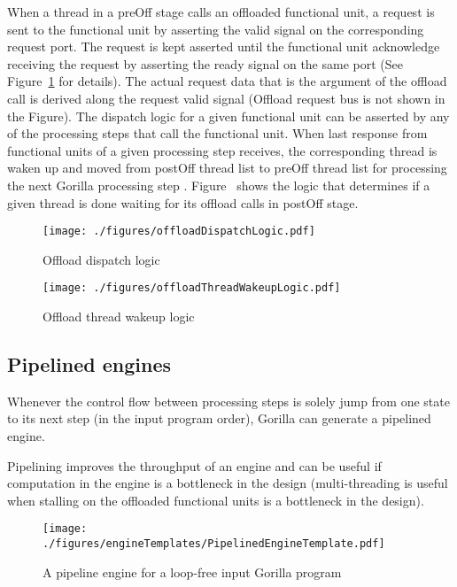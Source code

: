 \documentclass[a4paper, 12pt]{report}
\begin{document}
When a thread in a preOff stage calls an offloaded functional 
unit, a request is sent to the functional unit by asserting 
the valid signal on the corresponding request port. 
The request is kept asserted until the functional unit acknowledge 
receiving the request by asserting the ready signal on the same 
port (See Figure~\ref{fig:offloadDispatchLogic} for 
details). The actual request data that is the argument of 
the offload call is derived along the request valid signal 
(Offload request bus is not shown in the Figure).
The dispatch logic for a given functional unit can be 
asserted by any of the processing steps that call the 
functional unit.  
When last response from functional units of a given 
processing step receives, the corresponding thread is 
waken up and moved from postOff thread list to preOff 
thread list for processing the next Gorilla processing 
step . Figure~\label{fig:offloadThreadWakeupLogic} shows 
the logic that determines if a given thread is done waiting 
for its offload calls in postOff stage. 
 
\begin{figure}
\begin{center}
  \texttt{[image: ./figures/offloadDispatchLogic.pdf]}
  \caption{Offload dispatch logic}
  \label{fig:offloadDispatchLogic}
\end{center}
\end{figure}

\begin{figure}
\begin{center}
  \texttt{[image: ./figures/offloadThreadWakeupLogic.pdf]}
  \caption{Offload thread wakeup logic}
  \label{fig:offloadThreadWakeupLogic}
\end{center}
\end{figure}


\subsection{Pipelined engines}
Whenever the control flow between processing steps is 
solely jump from one state to its next step (in the input 
program order), Gorilla can generate a pipelined engine.

Pipelining improves the throughput of an engine and 
can be useful if computation in the engine is a bottleneck 
in the design (multi-threading is useful when stalling on 
the offloaded functional units is a bottleneck in the design).

\begin{figure}
\begin{center}
  \texttt{[image: ./figures/engineTemplates/PipelinedEngineTemplate.pdf]}
  \caption{A pipeline engine for a loop-free input Gorilla program}
  \label{fig: Pipelined template}
\end{center}
\end{figure}
\end{document}
